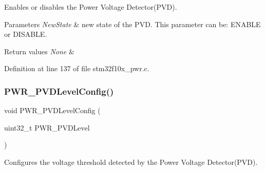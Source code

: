 Enables or disables the Power Voltage Detector(\+P\+V\+D). 


\begin{DoxyParams}{Parameters}
{\em New\+State} & new state of the P\+VD. This parameter can be\+: E\+N\+A\+B\+LE or D\+I\+S\+A\+B\+LE. \\
\hline
\end{DoxyParams}

\begin{DoxyRetVals}{Return values}
{\em None} & \\
\hline
\end{DoxyRetVals}


Definition at line 137 of file stm32f10x\+\_\+pwr.\+c.

\mbox{\label{group___p_w_r___exported___functions_ga237c143ef6aa55abb8049fa7bf24ab8f}} 
\subsubsection{\texorpdfstring{P\+W\+R\+\_\+\+P\+V\+D\+Level\+Config()}{PWR\_PVDLevelConfig()}}
{\footnotesize\ttfamily void P\+W\+R\+\_\+\+P\+V\+D\+Level\+Config (\begin{DoxyParamCaption}\item[{uint32\+\_\+t}]{P\+W\+R\+\_\+\+P\+V\+D\+Level }\end{DoxyParamCaption})}



Configures the voltage threshold detected by the Power Voltage Detector(\+P\+V\+D). 


